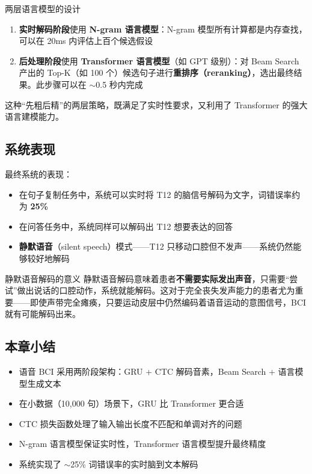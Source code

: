 \documentclass[a4paper]{article}
\begin{document}
\begin{importantbox}{两层语言模型的设计}
\begin{enumerate}
    \item \textbf{实时解码阶段}使用 \textbf{N-gram 语言模型}：N-gram 模型所有计算都是内存查找，可以在 20ms 内评估上百个候选假设
    \item \textbf{后处理阶段}使用 \textbf{Transformer 语言模型}（如 GPT 级别）：对 Beam Search 产出的 Top-K（如 100 个）候选句子进行\textbf{重排序（reranking）}，选出最终结果。此步骤可以在 $\sim$0.5 秒内完成
\end{enumerate}

这种``先粗后精''的两层策略，既满足了实时性要求，又利用了 Transformer 的强大语言建模能力。
\end{importantbox}

\subsection{系统表现}

最终系统的表现：

\begin{itemize}
    \item 在句子复制任务中，系统可以实时将 T12 的脑信号解码为文字，词错误率约为 \textbf{25\%}
    \item 在问答任务中，系统同样可以解码出 T12 想要表达的回答
    \item \textbf{静默语音}（silent speech）模式——T12 只移动口腔但不发声——系统仍然能够较好地解码
\end{itemize}

\begin{knowledgebox}{静默语音解码的意义}
静默语音解码意味着患者\textbf{不需要实际发出声音}，只需要``尝试''做出说话的口腔动作，系统就能解码。这对于完全丧失发声能力的患者尤为重要——即使声带完全瘫痪，只要运动皮层中仍然编码着语音运动的意图信号，BCI 就有可能解码出来。
\end{knowledgebox}

\subsection{本章小结}

\begin{itemize}
    \item 语音 BCI 采用两阶段架构：GRU + CTC 解码音素，Beam Search + 语言模型生成文本
    \item 在小数据（10,000 句）场景下，GRU 比 Transformer 更合适
    \item CTC 损失函数处理了输入输出长度不匹配和单调对齐的问题
    \item N-gram 语言模型保证实时性，Transformer 语言模型提升最终精度
    \item 系统实现了 $\sim$25\% 词错误率的实时脑到文本解码
\end{itemize}
\end{document}
